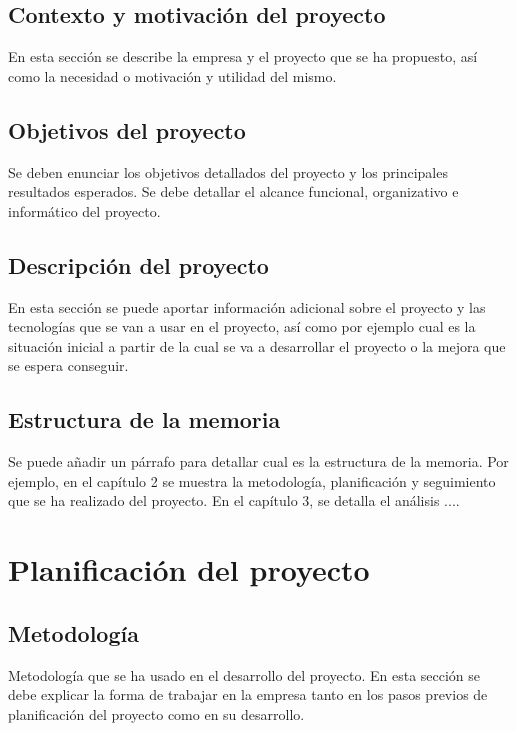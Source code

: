 \documentclass[pdftex,11pt,a4paper]{book}
\begin{document}
\section{Contexto y motivación del proyecto}

En esta sección se describe la empresa y el proyecto que se ha propuesto, así como la necesidad o motivación y utilidad del mismo.

\section{Objetivos del proyecto}

Se deben enunciar los objetivos detallados del proyecto y los principales resultados esperados. Se debe detallar el alcance funcional, organizativo e informático del proyecto.

\section{Descripción del proyecto}

En esta sección se puede aportar información adicional sobre el proyecto y las tecnologías que se van a usar en el proyecto, así como por ejemplo cual es la situación inicial a partir de la cual se va a desarrollar el proyecto o la mejora que se espera conseguir.

\section{Estructura de la memoria}

Se puede añadir un párrafo para detallar cual es la estructura de la memoria. Por ejemplo, en el capítulo 2 se muestra la metodología, planificación y seguimiento que se ha realizado del proyecto. En el capítulo 3, se detalla el análisis ....

\chapter{Planificación del proyecto}

\section{Metodología}

Metodología que se ha usado en el desarrollo del proyecto. En esta sección se debe explicar la forma de trabajar en la empresa tanto en los pasos previos de planificación del proyecto como en su desarrollo.
\end{document}
